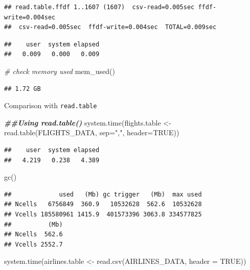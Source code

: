 \documentclass[
  12pt,
]{style/krantz}
\newenvironment{Shaded}{\begin{snugshade}}{\end{snugshade}}
\newcommand{\AttributeTok}[1]{\textcolor[rgb]{0.77,0.63,0.00}{#1}}
\newcommand{\CommentTok}[1]{\textcolor[rgb]{0.56,0.35,0.01}{\textit{#1}}}
\newcommand{\ConstantTok}[1]{\textcolor[rgb]{0.00,0.00,0.00}{#1}}
\newcommand{\DocumentationTok}[1]{\textcolor[rgb]{0.56,0.35,0.01}{\textbf{\textit{#1}}}}
\newcommand{\FunctionTok}[1]{\textcolor[rgb]{0.00,0.00,0.00}{#1}}
\newcommand{\NormalTok}[1]{#1}
\newcommand{\OtherTok}[1]{\textcolor[rgb]{0.56,0.35,0.01}{#1}}
\newcommand{\StringTok}[1]{\textcolor[rgb]{0.31,0.60,0.02}{#1}}
\begin{document}
\begin{verbatim}
## read.table.ffdf 1..1607 (1607)  csv-read=0.005sec ffdf-write=0.004sec
##  csv-read=0.005sec  ffdf-write=0.004sec  TOTAL=0.009sec
\end{verbatim}

\begin{verbatim}
##    user  system elapsed 
##   0.009   0.000   0.009
\end{verbatim}

\begin{Shaded}
\begin{Highlighting}[]
\CommentTok{\# check memory used}
\FunctionTok{mem\_used}\NormalTok{()}
\end{Highlighting}
\end{Shaded}

\begin{verbatim}
## 1.72 GB
\end{verbatim}

Comparison with \texttt{read.table}

\begin{Shaded}
\begin{Highlighting}[]
\DocumentationTok{\#\#Using read.table()}
\FunctionTok{system.time}\NormalTok{(flights.table }\OtherTok{\textless{}{-}} \FunctionTok{read.table}\NormalTok{(FLIGHTS\_DATA, }
                                        \AttributeTok{sep=}\StringTok{","}\NormalTok{,}
                                        \AttributeTok{header=}\ConstantTok{TRUE}\NormalTok{))}
\end{Highlighting}
\end{Shaded}

\begin{verbatim}
##    user  system elapsed 
##   4.219   0.238   4.389
\end{verbatim}

\begin{Shaded}
\begin{Highlighting}[]
\FunctionTok{gc}\NormalTok{()}
\end{Highlighting}
\end{Shaded}

\begin{verbatim}
##             used   (Mb) gc trigger   (Mb)  max used
## Ncells   6756849  360.9   10532628  562.6  10532628
## Vcells 185580961 1415.9  401573396 3063.8 334577825
##          (Mb)
## Ncells  562.6
## Vcells 2552.7
\end{verbatim}

\begin{Shaded}
\begin{Highlighting}[]
\FunctionTok{system.time}\NormalTok{(airlines.table }\OtherTok{\textless{}{-}} \FunctionTok{read.csv}\NormalTok{(AIRLINES\_DATA,}
                                       \AttributeTok{header =} \ConstantTok{TRUE}\NormalTok{))}
\end{Highlighting}
\end{Shaded}
\end{document}
